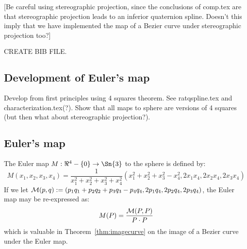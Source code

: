 \documentclass[12pt]{article}
\begin{document}

[Be careful using stereographic projection, since the conclusions of comp.tex are that
stereographic projection leads to an inferior quaternion spline.
Doesn't this imply that we have implemented the map of a Bezier curve under
stereographic projection too?]

CREATE BIB FILE.

\clearpage

\subsection{Development of Euler's map}

Develop from first principles using 4 squares theorem.
See ratqspline.tex and characterization.tex(?).
Show that all maps to sphere are versions of 4 squares (but then what about stereographic
projection?).

\clearpage

\subsection{Euler's map}

\begin{defn2}
The Euler map $M: \Re^4 - \{0\} \rightarrow \Sn{3}$ to the sphere is defined by:
\begin{equation}
\label{eqM}
	M(x_1,x_2,x_3,x_4) =
	\frac{1}{x_1^2 + x_2^2 + x_3^2 + x_4^2}
	(x_1^2 + x_2^2 + x_3^2 - x_4^2, 2x_1x_4, 2x_2x_4, 2x_3x_4)
\end{equation}
%
If we let 
${\cal M}(p,q): = (p_1q_1 + p_2q_2 + p_3q_3 - p_4q_4, 2p_1q_4, 2p_2q_4, 2p_3q_4)$,
the Euler map may be re-expressed as:
\begin{equation}
\label{eq:calM}
M(P) = \frac{{\cal M}(P,P)}{P \cdot P}
\end{equation}
which is valuable in Theorem~\ref{thm:imagecurve} on the image of a Bezier curve
under the Euler map.
\end{defn2}
\end{document}
